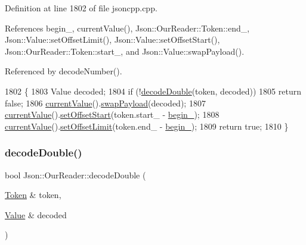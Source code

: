 Definition at line 1802 of file jsoncpp.\+cpp.



References begin\+\_\+, current\+Value(), Json\+::\+Our\+Reader\+::\+Token\+::end\+\_\+, Json\+::\+Value\+::set\+Offset\+Limit(), Json\+::\+Value\+::set\+Offset\+Start(), Json\+::\+Our\+Reader\+::\+Token\+::start\+\_\+, and Json\+::\+Value\+::swap\+Payload().



Referenced by decode\+Number().


\begin{DoxyCode}
1802                                          \{
1803   Value decoded;
1804   \textcolor{keywordflow}{if} (!\hyperlink{class_json_1_1_our_reader_a1d1c3b44f6720a0e7c39b5ae8de3981c}{decodeDouble}(token, decoded))
1805     \textcolor{keywordflow}{return} \textcolor{keyword}{false};
1806   \hyperlink{class_json_1_1_our_reader_a2acd5b1d53e7d7e17c21ff8e96edc09d}{currentValue}().\hyperlink{class_json_1_1_value_a5263476047f20e2fc6de470e4de34fe5}{swapPayload}(decoded);
1807   \hyperlink{class_json_1_1_our_reader_a2acd5b1d53e7d7e17c21ff8e96edc09d}{currentValue}().\hyperlink{class_json_1_1_value_a92e32ea0f4f8a15853a3cf0beac9feb9}{setOffsetStart}(token.start\_ - \hyperlink{class_json_1_1_our_reader_a9bda9d72335d52cd06e65f9eca3f70f5}{begin\_});
1808   \hyperlink{class_json_1_1_our_reader_a2acd5b1d53e7d7e17c21ff8e96edc09d}{currentValue}().\hyperlink{class_json_1_1_value_a5e4f5853fec138150c5df6004a8c2bcf}{setOffsetLimit}(token.end\_ - \hyperlink{class_json_1_1_our_reader_a9bda9d72335d52cd06e65f9eca3f70f5}{begin\_});
1809   \textcolor{keywordflow}{return} \textcolor{keyword}{true};
1810 \}
\end{DoxyCode}
\mbox{\label{class_json_1_1_our_reader_aa5c15a8cd32754f07430dedba3d1308e}} 
\subsubsection{\texorpdfstring{decode\+Double()}{decodeDouble()}\hspace{0.1cm}{\footnotesize\ttfamily [2/2]}}
{\footnotesize\ttfamily bool Json\+::\+Our\+Reader\+::decode\+Double (\begin{DoxyParamCaption}\item[{\hyperlink{class_json_1_1_our_reader_1_1_token}{Token} \&}]{token,  }\item[{\hyperlink{class_json_1_1_value}{Value} \&}]{decoded }\end{DoxyParamCaption})\hspace{0.3cm}{\ttfamily [private]}}



